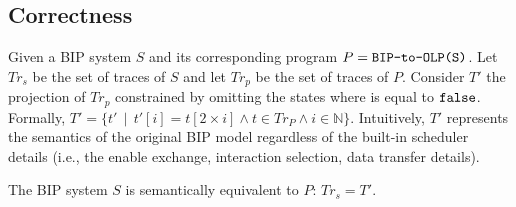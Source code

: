 \subsection{Correctness}
%
Given a BIP system $S$ and its corresponding \caig program $P = \texttt{BIP-to-OLP(S)}$. 
Let $Tr_s$ be the set of traces of $S$ and let $Tr_p$ be the set of traces of $P$. 
Consider $T'$ the projection of $Tr_p$ constrained by omitting the states where  is equal to $\mathtt{false}$. 
Formally, $T'  = \{t' \,\mid\, t'[i] = t[2\times i] \wedge t \in Tr_P \wedge i \in \mathbb{N}\}$. 
Intuitively, $T'$ represents the semantics of the original BIP model regardless of the built-in scheduler details 
(i.e., the enable exchange, interaction selection, data transfer details). 
%
\begin{theorem}
\label{theorem:correct}
The BIP system $S$ is semantically equivalent to $P$: $Tr_s=T'$.  
\end{theorem}
